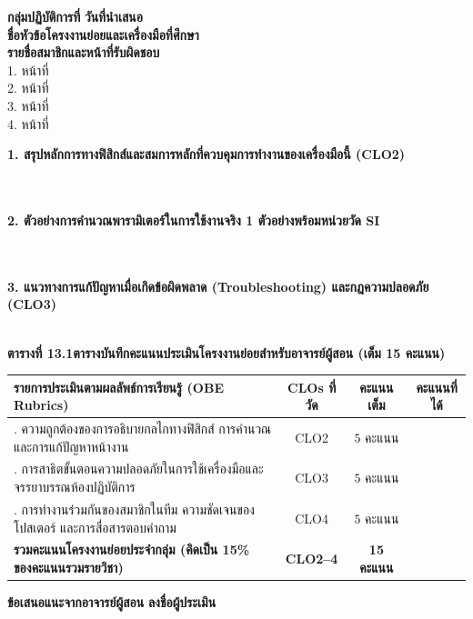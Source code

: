 \begin{worksheetbox}
\textbf{กลุ่มปฏิบัติการที่} \dotfill \textbf{วันที่นำเสนอ} \dotfill\\[4pt]
\textbf{ชื่อหัวข้อโครงงานย่อยและเครื่องมือที่ศึกษา} \dotfill\\[4pt]
\textbf{รายชื่อสมาชิกและหน้าที่รับผิดชอบ}\\[2pt]
1. \dotfill หน้าที่ \dotfill\\[2pt]
2. \dotfill หน้าที่ \dotfill\\[2pt]
3. \dotfill หน้าที่ \dotfill\\[2pt]
4. \dotfill หน้าที่ \dotfill

\vspace{6pt}
\textbf{1. สรุปหลักการทางฟิสิกส์และสมการหลักที่ควบคุมการทำงานของเครื่องมือนี้ (CLO2)}\\[4pt]
\dotfill\\[6pt]
\dotfill\\[6pt]
\dotfill

\vspace{6pt}
\textbf{2. ตัวอย่างการคำนวณพารามิเตอร์ในการใช้งานจริง 1 ตัวอย่างพร้อมหน่วยวัด SI}\\[4pt]
\dotfill\\[6pt]
\dotfill\\[6pt]
\dotfill

\vspace{6pt}
\textbf{3. แนวทางการแก้ปัญหาเมื่อเกิดข้อผิดพลาด (Troubleshooting) และกฎความปลอดภัย (CLO3)}\\[4pt]
\dotfill\\[6pt]
\dotfill

\vspace{6pt}
\textbf{ตารางที่ 13.1\quad ตารางบันทึกคะแนนประเมินโครงงานย่อยสำหรับอาจารย์ผู้สอน (เต็ม 15 คะแนน)}
\begin{center}
\footnotesize\setlength{\tabcolsep}{3.5pt}
\begin{tabularx}{\linewidth}{>{\raggedright\arraybackslash}X c c c}
\toprule
\textbf{รายการประเมินตามผลลัพธ์การเรียนรู้ (OBE Rubrics)} & \textbf{CLOs ที่วัด} & \textbf{คะแนนเต็ม} & \textbf{คะแนนที่ได้} \\
\midrule
1. ความถูกต้องของการอธิบายกลไกทางฟิสิกส์ การคำนวณ และการแก้ปัญหาหน้างาน & CLO2 & $5\text{ คะแนน}$ & \dotfill \\[6pt]
2. การสาธิตขั้นตอนความปลอดภัยในการใช้เครื่องมือและจรรยาบรรณห้องปฏิบัติการ & CLO3 & $5\text{ คะแนน}$ & \dotfill \\[6pt]
3. การทำงานร่วมกันของสมาชิกในทีม ความชัดเจนของโปสเตอร์ และการสื่อสารตอบคำถาม & CLO4 & $5\text{ คะแนน}$ & \dotfill \\
\midrule
\textbf{รวมคะแนนโครงงานย่อยประจำกลุ่ม (คิดเป็น 15\% ของคะแนนรวมรายวิชา)} & \textbf{CLO2--4} & \textbf{15 คะแนน} & \dotfill \\
\bottomrule
\end{tabularx}
\end{center}

\vspace{4pt}
\textbf{ข้อเสนอแนะจากอาจารย์ผู้สอน} \dotfill \textbf{ลงชื่อผู้ประเมิน} \dotfill
\end{worksheetbox}
